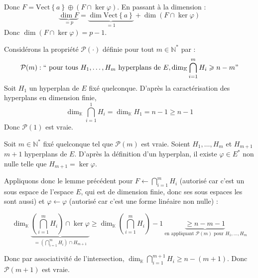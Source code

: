 \documentclass{article}
\begin{document}
\begin{question_kholle}
	Donc $F = \text{Vect} \left\{ a \right\} \oplus (F \cap \ker \varphi)$.
	En passant à la dimension :
	$$
		\underbrace{ \dim F }_{= p } = \underbrace{ \dim \text{Vect} \left\{ a \right\} }_{ =1 } + \dim (F \cap \ker \varphi)
	$$
	Donc $\dim (F \cap \ker \varphi) = p - 1$.
	\newline \newline

	Considérons la propriété $\mathcal{P}(\cdot)$ définie pour tout $m \in \mathbb{N}^{*}$ par :
	$$
		\mathcal{P}(m) : \text{\textquotedblleft} \text{ pour tous } H_{1},\dots, H_{m} \text{ hyperplans de } E, \dim_{\mathbb{K}} \bigcap_{i=1}^{m}H_{i} \geqslant n-m \text{\textquotedblright}
	$$
	Soit $H_{1}$ un hyperplan de $E$ fixé quelconque. D'après la caractérisation des hyperplans en dimension finie,
	$$
		\dim_{\mathbb{K}} \bigcap_{i=1}^{1}H_{i} = \dim_{\mathbb{K}}H_{1}= n-1 \geqslant n-1
	$$
	Donc $\mathcal{P}(1)$ est vraie.

	Soit $m \in \mathbb{N}^{*}$ fixé quelconque tel que $\mathcal{P}(m)$ est vraie.
	Soient $H_{1},\dots,H_{m}$ et $H_{m+1}$ $m+1$ hyperplans de $E$.
	D'après la définition d'un hyperplan, il existe $\varphi \in E ^{*}$ non nulle telle que $H_{m+1} = \ker \varphi$.

	Appliquons donc le lemme précédent pour $F \leftarrow \bigcap_{i=1}^{m}H_{i}$ (autorisé car c'est un sous espace de l'espace $E$, qui est de dimension finie, donc ses sous espaces les sont aussi) et $\varphi \leftarrow \varphi$ (autorisé car c'est une forme linéaire non nulle) :

	$$
		\dim_{\mathbb{K}} \underbrace{ \left( \bigcap_{i=1}^{m}H_{i} \right) \cap \ker \varphi  }_{ =\left( \bigcap_{i=1}^{m}H_{i}  \right)\cap H_{m+1} }\geqslant \dim_{\mathbb{K}} \left( \bigcap_{i=1}^{m}H_{i} \right) - 1 \underbrace{ \geqslant n - m - 1 }_{ \text{ en appliquant } \mathcal{P}(m) \text{ pour } H_{1},\dots,H_{m} }
	$$

	Donc par associativité de l'intersection, $\dim_{\mathbb{K}} \bigcap_{i=1}^{m+1}H_{i} \geqslant n - (m+1)$.
	Donc $\mathcal{P}(m+1)$ est vraie.
\end{question_kholle}
\end{document}
